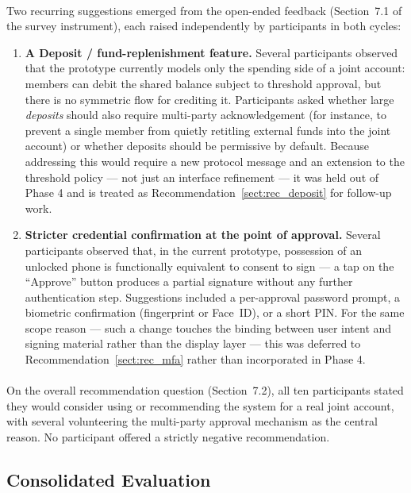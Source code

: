 \paragraph{}Two recurring suggestions emerged from the open-ended feedback (Section~7.1 of the survey instrument), each raised independently by participants in both cycles:

\begin{enumerate}
  \item \textbf{A Deposit / fund-replenishment feature.} Several participants observed that the prototype currently models only the spending side of a joint account: members can debit the shared balance subject to threshold approval, but there is no symmetric flow for crediting it. Participants asked whether large \textit{deposits} should also require multi-party acknowledgement (for instance, to prevent a single member from quietly retitling external funds into the joint account) or whether deposits should be permissive by default. Because addressing this would require a new protocol message and an extension to the threshold policy --- not just an interface refinement --- it was held out of Phase 4 and is treated as Recommendation~\ref{sect:rec_deposit} for follow-up work.
  \item \textbf{Stricter credential confirmation at the point of approval.} Several participants observed that, in the current prototype, possession of an unlocked phone is functionally equivalent to consent to sign --- a tap on the ``Approve'' button produces a partial signature without any further authentication step. Suggestions included a per-approval password prompt, a biometric confirmation (fingerprint or Face~ID), or a short PIN. For the same scope reason --- such a change touches the binding between user intent and signing material rather than the display layer --- this was deferred to Recommendation~\ref{sect:rec_mfa} rather than incorporated in Phase 4.
\end{enumerate}

\paragraph{}On the overall recommendation question (Section~7.2), all ten participants stated they would consider using or recommending the system for a real joint account, with several volunteering the multi-party approval mechanism as the central reason. No participant offered a strictly negative recommendation.

\subsection{Consolidated Evaluation}
\label{sect:results_summary}


